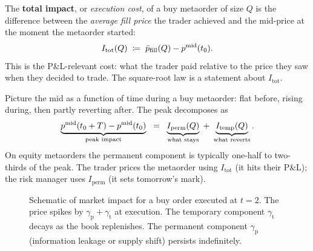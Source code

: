 \begin{definition}
\label{def:total_impact}
The \textbf{total impact}, or \emph{execution cost}, of a buy
metaorder of size $Q$ is the difference between the \emph{average
fill price} the trader achieved and the mid-price at the moment the
metaorder started:
\[
  I_{\text{tot}}(Q) \;\coloneqq\; \bar{p}_{\text{fill}}(Q) - p^{\mathrm{mid}}(t_0).
\]
This is the P\&L-relevant cost: what the trader paid relative to the
price they saw when they decided to trade. The square-root law is a
statement about $I_{\text{tot}}$.
\end{definition}

Picture the mid as a function of time during a buy metaorder: flat
before, rising during, then partly reverting after. The peak
decomposes as
\[
  \underbrace{p^{\mathrm{mid}}(t_0 + T) - p^{\mathrm{mid}}(t_0)}_{\text{peak impact}}
  \;\;=\;\;
  \underbrace{I_{\text{perm}}(Q)}_{\text{what stays}}
  \;+\;
  \underbrace{I_{\text{temp}}(Q)}_{\text{what reverts}}.
\]
On equity metaorders the permanent component is typically one-half to
two-thirds of the peak. The trader prices the metaorder using
$I_{\text{tot}}$ (it hits their P\&L); the risk manager uses
$I_{\text{perm}}$ (it sets tomorrow's mark).

\begin{figure}[ht]
\centering
{}
\caption{Schematic of market impact for a buy order executed at $t=2$.
The price spikes by $\gamma_{\mathrm{p}} + \gamma_{\mathrm{t}}$ at execution.
The temporary component $\gamma_{\mathrm{t}}$ decays as the book replenishes.
The permanent component $\gamma_{\mathrm{p}}$ (information leakage or supply shift) persists indefinitely.}
\label{fig:impact_decomp}
\end{figure}

